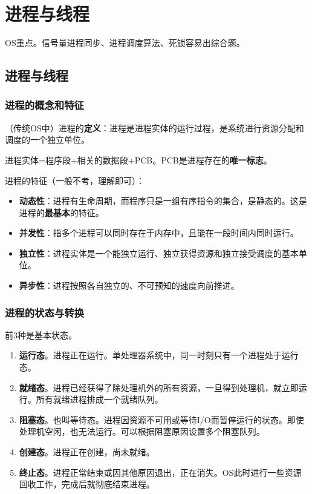 \documentclass[12pt, a4paper, oneside]{ctexart}
\begin{document}
\section{进程与线程}

OS重点。信号量进程同步、进程调度算法、死锁容易出综合题。

\subsection{进程与线程}

\subsubsection{进程的概念和特征}

（传统OS中）进程的\textbf{定义}：进程是进程实体的运行过程，是系统进行资源分配和调度的一个独立单位。

进程实体=程序段+相关的数据段+PCB。PCB是进程存在的\textbf{唯一标志}。

进程的特征（一般不考，理解即可）：
\begin{itemize}
    \item {\bf 动态性}：进程有生命周期，而程序只是一组有序指令的集合，是静态的。这是进程的\textbf{最基本}的特征。
    \item {\bf 并发性}：指多个进程可以同时存在于内存中，且能在一段时间内同时运行。
    \item {\bf 独立性}：进程实体是一个能独立运行、独立获得资源和独立接受调度的基本单位。
    \item {\bf 异步性}：进程按照各自独立的、不可预知的速度向前推进。
\end{itemize}

\subsubsection{进程的状态与转换}

前3种是基本状态。
\begin{enumerate}
  \item {\bf 运行态}。进程正在运行。单处理器系统中，同一时刻只有一个进程处于运行态。
  \item {\bf 就绪态}。进程已经获得了除处理机外的所有资源，一旦得到处理机，就立即运行。所有就绪进程排成一个就绪队列。
  \item {\bf 阻塞态}。也叫等待态。进程因资源不可用或等待I/O而暂停运行的状态。即使处理机空闲，也无法运行。可以根据阻塞原因设置多个阻塞队列。
  \item {\bf 创建态}。进程正在创建，尚未就绪。
  \item {\bf 终止态}。进程正常结束或因其他原因退出，正在消失。OS此时进行一些资源回收工作，完成后就彻底结束进程。
\end{enumerate}
\end{document}
